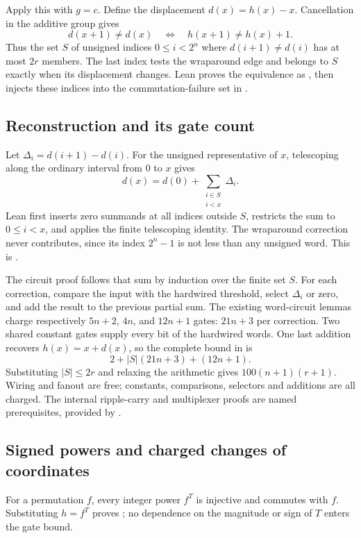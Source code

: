 Apply this with $g=c$. Define the displacement $d(x)=h(x)-x$.
Cancellation in the additive group gives
\[
 d(x+1)\ne d(x)\quad\Longleftrightarrow\quad h(x+1)\ne h(x)+1.
\]
Thus the set $S$ of unsigned indices $0\le i<2^n$ where
$d(i+1)\ne d(i)$ has at most $2r$ members. The last index tests the
wraparound edge and belongs to $S$ exactly when its displacement changes.
Lean proves the equivalence as , then injects
these indices into the commutation-failure set in .

\subsection{Reconstruction and its gate count}

Let $\Delta_i=d(i+1)-d(i)$. For the unsigned representative of $x$, telescoping
along the ordinary interval from $0$ to $x$ gives
\[
 d(x)=d(0)+\sum_{\substack{i\in S\\i<x}}\Delta_i.
\]
Lean first inserts zero summands at all indices outside $S$, restricts the sum
to $0\le i<x$, and applies the finite telescoping identity. The wraparound
correction never contributes, since its index $2^n-1$ is not less than any
unsigned word. This is .

The circuit proof follows that sum by induction over the finite set $S$.
For each correction, compare the input with the hardwired threshold, select
$\Delta_i$ or zero, and add the result to the previous partial sum. The existing
word-circuit lemmas charge respectively $5n+2$, $4n$, and $12n+1$ gates:
$21n+3$ per correction. Two shared constant gates supply every bit of the
hardwired words. One last addition recovers $h(x)=x+d(x)$, so the complete
bound in  is
\[
 2+|S|(21n+3)+(12n+1).
\]
Substituting $|S|\le 2r$ and relaxing the arithmetic gives
$100(n+1)(r+1)$. Wiring and fanout are free; constants, comparisons,
selectors and additions are all charged. The internal ripple-carry and
multiplexer proofs are named prerequisites, provided by
.

\subsection{Signed powers and charged changes of coordinates}

For a permutation $f$, every integer power $f^T$ is injective and commutes
with $f$. Substituting $h=f^T$ proves ; no dependence
on the magnitude or sign of $T$ enters the gate bound.


